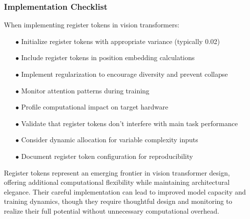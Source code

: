 \subsubsection{Implementation Checklist}

When implementing register tokens in vision transformers:

\begin{itemize}
    \item[$\bullet$] Initialize register tokens with appropriate variance (typically 0.02)
    \item[$\bullet$] Include register tokens in position embedding calculations
    \item[$\bullet$] Implement regularization to encourage diversity and prevent collapse
    \item[$\bullet$] Monitor attention patterns during training
    \item[$\bullet$] Profile computational impact on target hardware
    \item[$\bullet$] Validate that register tokens don't interfere with main task performance
    \item[$\bullet$] Consider dynamic allocation for variable complexity inputs
    \item[$\bullet$] Document register token configuration for reproducibility
\end{itemize}

Register tokens represent an emerging frontier in vision transformer design, offering additional computational flexibility while maintaining architectural elegance. Their careful implementation can lead to improved model capacity and training dynamics, though they require thoughtful design and monitoring to realize their full potential without unnecessary computational overhead.
